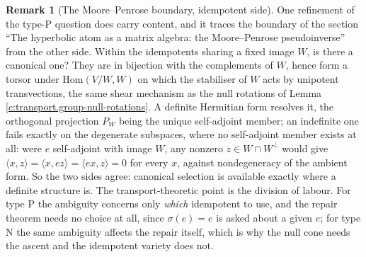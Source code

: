 \documentclass[11pt]{article}
\theoremstyle{definition}
\newtheorem{remark}[theorem]{Remark}
\theoremstyle{plain}
\begin{document}
\begin{remark}[The Moore--Penrose boundary, idempotent side]\label{c:note.transport.moore-penrose-boundary-idempotent-side}
One refinement of the type-P question does carry content, and it traces the boundary of the section ``The hyperbolic atom as a matrix algebra: the Moore--Penrose pseudoinverse'' from the other side. Within the idempotents sharing a fixed image $W$, is there a canonical one? They are in bijection with the complements of $W$, hence form a torsor under $\mathrm{Hom}(V/W, W)$ on which the stabiliser of $W$ acts by unipotent transvections, the same shear mechanism as the null rotations of Lemma \ref{c:transport.group-null-rotations}. A definite Hermitian form resolves it, the orthogonal projection $P_W$ being the unique self-adjoint member; an indefinite one fails exactly on the degenerate subspaces, where no self-adjoint member exists at all: were $e$ self-adjoint with image $W$, any nonzero $z \in W \cap W^{\perp}$ would give $\langle x, z\rangle = \langle x, ez\rangle = \langle ex, z\rangle = 0$ for every $x$, against nondegeneracy of the ambient form. So the two sides agree: canonical selection is available exactly where a definite structure is. The transport-theoretic point is the division of labour. For type P the ambiguity concerns only \emph{which} idempotent to use, and the repair theorem needs no choice at all, since $\sigma(e) = e$ is asked about a given $e$; for type N the same ambiguity affects the repair itself, which is why the null cone needs the ascent and the idempotent variety does not.
\end{remark}
\end{document}
